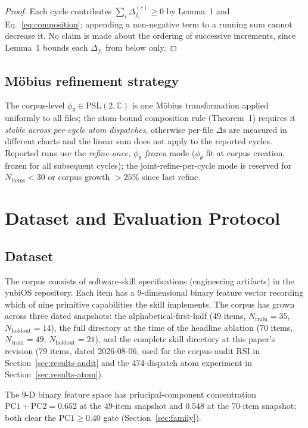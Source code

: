 \documentclass[11pt,a4paper]{article}
\theoremstyle{plain}
\theoremstyle{remark}
\theoremstyle{plain}
\begin{document}
\begin{proof}
Each cycle contributes $\sum_i \Delta^{(c)}_{f_i} \geq 0$ by Lemma~1 and Eq.~\ref{eq:composition}; appending a non-negative term to a running sum cannot decrease it. No claim is made about the ordering of successive increments, since Lemma~1 bounds each $\Delta_{f_i}$ from below only.
\end{proof}

\subsection{M\"obius refinement strategy}

The corpus-level $\phi_\theta \in \mathrm{PSL}(2,\mathbb{C})$ is one M\"obius transformation applied uniformly to all files; the atom-bound composition rule (Theorem~1) requires it \emph{stable across per-cycle atom dispatches}, otherwise per-file $\Delta$s are measured in different charts and the linear sum does not apply to the reported cycles. Reported runs use the \emph{refine-once, $\phi_\theta$ frozen} mode ($\phi_\theta$ fit at corpus creation, frozen for all subsequent cycles); the joint-refine-per-cycle mode is reserved for $N_{\mathrm{items}} < 30$ or corpus growth $> 25\%$ since last refine.

\section{Dataset and Evaluation Protocol}
\label{sec:dataset}

\subsection{Dataset}

The corpus consists of software-skill specifications (engineering artifacts) in the yubiOS repository. Each item has a 9-dimensional binary feature vector recording which of nine primitive capabilities the skill implements. The corpus has grown across three dated snapshots: the alphabetical-first-half (49 items, $N_{\mathrm{train}}=35$, $N_{\mathrm{holdout}}=14$), the full directory at the time of the headline ablation (70 items, $N_{\mathrm{train}}=49$, $N_{\mathrm{holdout}}=21$), and the complete skill directory at this paper's revision (79 items, dated 2026-08-06, used for the corpus-audit RSI in Section~\ref{sec:results-audit} and the 474-dispatch atom experiment in Section~\ref{sec:results-atom}).

The 9-D binary feature space has principal-component concentration $\mathrm{PC1}+\mathrm{PC2} = 0.652$ at the 49-item snapshot and $0.548$ at the 70-item snapshot; both clear the $\mathrm{PC1} \geq 0.40$ gate (Section~\ref{sec:family}).
\end{document}
